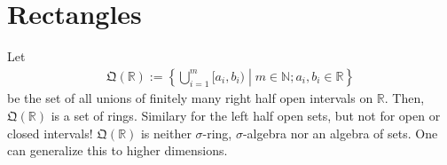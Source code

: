 %
%
%
%
%
\section{Rectangles}
\begin{example}
    Let
    \begin{align}
        \mathfrak{Q}(\mathbb{R}) := \left\{ \bigcup_{i=1}^m [a_i, b_i)  \middle| m \in \mathbb{N}; a_i, b_i \in \mathbb{R} \right\}
    \end{align}
    be the set of all unions of finitely many right half open intervals on \(\mathbb{R}\). Then, \(\mathfrak{Q}(\mathbb{R})\) is a set of rings. Similary for the left half open sets, but not for open or closed intervals!
    \(\mathfrak{Q}(\mathbb{R})\) is neither \(\sigma\)-ring, \(\sigma\)-algebra nor an algebra of sets.
    One can generalize this to higher dimensions.
\end{example}
%
%
%
%
%
%
%
%
%
%
